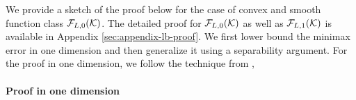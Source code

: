 \label{sec:lb-proof}
We provide a sketch of the proof below for the case of convex and smooth function class $\mathcal{F}_{L,0}(\mathcal{K})$. The detailed proof for $\mathcal{F}_{L,0}(\mathcal{K})$ as well as $\mathcal{F}_{L,1}(\mathcal{K})$ is available in Appendix \ref{sec:appendix-lb-proof}.
We first lower bound  the minimax error in one dimension and then generalize it using a separability argument. For the proof in one dimension, we follow the technique from \cite{shamir2012complexity,duchi2015optimal},  

\paragraph{Proof in one dimension}


